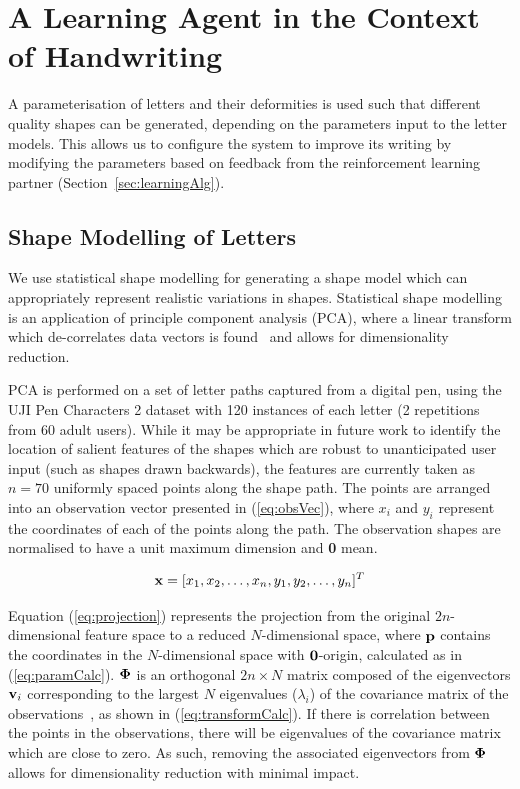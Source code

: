 \documentclass{sig-alternate}
\begin{document}
\section{A Learning Agent in the Context of Handwriting} \label{sec:learningAlgorithm}

A parameterisation of letters and their deformities is used such 
that different quality shapes can be generated, depending on the parameters input to
the letter models. This allows us to configure the system to improve its writing 
by modifying the parameters based on feedback from the 
reinforcement learning partner (Section~\ref{sec:learningAlg}). 


\subsection{Shape Modelling of Letters} \label{sec:writingGeneration}

We use statistical shape modelling for generating a shape model which can
appropriately represent realistic variations in shapes. Statistical shape
modelling is an application of principle component analysis (PCA), where a
linear transform which de-correlates data vectors is found~\cite{Stegmann2002}
and allows for dimensionality reduction. 

PCA is performed on a set of letter paths captured from a digital pen,
using the UJI Pen Characters 2 dataset \cite{Llorens2008} with 120 instances of
each letter (2 repetitions from 60 adult users). While it may be appropriate in future work to
identify the location of salient features of the shapes which are robust to 
unanticipated user input (such as shapes drawn backwards),
the features are currently taken as $n=70$ uniformly spaced points along the shape
path. The
points are arranged into an observation vector presented in (\ref{eq:obsVec}),
where $x_i$ and $y_i$ represent the coordinates of each of the points along the
path. The observation shapes are normalised to have a unit maximum dimension 
and {\bf 0} mean.

\begin{equation}\label{eq:obsVec}
{\bf x} = [x_1, x_2, \ldots, x_n, y_1, y_2, \ldots, y_n]^T
\end{equation}

Equation (\ref{eq:projection}) represents the projection from the original 
$2n$-dimensional feature space to a reduced $N$-dimensional space, where ${\bf p}$
contains the coordinates in the $N$-dimensional space with ${\bf 0}$-origin,
calculated as in (\ref{eq:paramCalc}). 
${\bf \Phi }$ is
an orthogonal $2n\times N$ matrix composed of the eigenvectors ${\bf v}_i$ corresponding to
the largest $N$ eigenvalues ($\lambda_i$) of the covariance matrix of the
observations~\cite{Stegmann2002}, as shown in (\ref{eq:transformCalc}). 
If there is correlation between the points in the observations, there will be
eigenvalues of the covariance matrix which are close to zero. As such, removing
the associated eigenvectors from ${\bf \Phi}$ allows for dimensionality
reduction with minimal impact.
\end{document}
